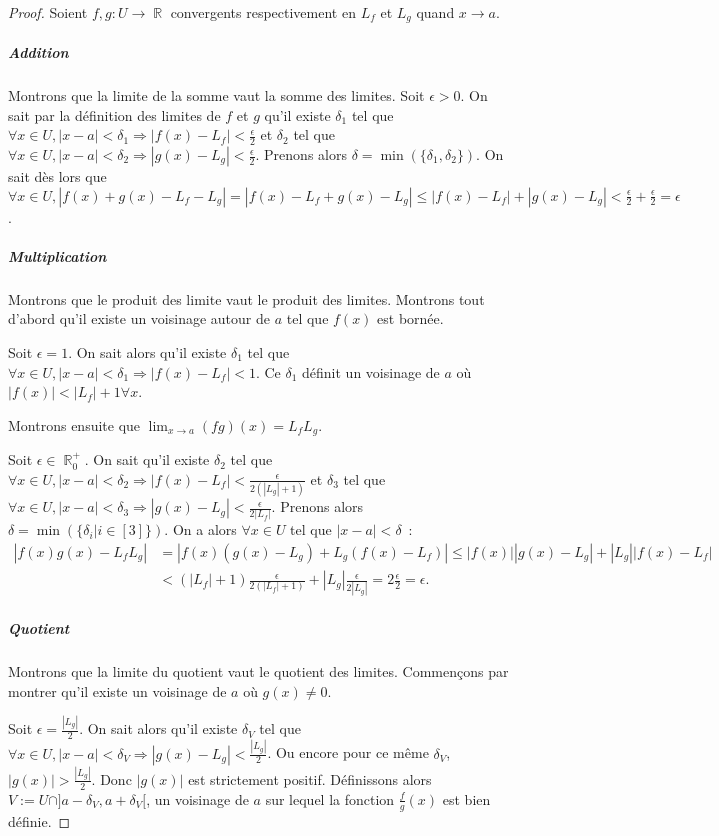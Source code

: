 \documentclass{article}
\DeclareMathOperator{\R}{\mathbb R}
\theoremstyle{definition}
\theoremstyle{remark}
\begin{document}
			\begin{proof} Soient $f, g : U \to \R$ convergents respectivement en $L_f$ et $L_g$ quand $x \to a$.

			\subparagraph{Addition} Montrons que la limite de la somme vaut la somme des limites.
			Soit $\epsilon > 0$. On sait par la définition des limites de $f$ et $g$ qu'il existe $\delta_1$ tel que $\forall x \in U, |x-a| < \delta_1
			\Rightarrow |f(x) - L_f| < \frac \epsilon2$
			et $\delta_2$ tel que $\forall x \in U, |x-a| < \delta_2 \Rightarrow |g(x)-L_g| < \frac \epsilon2$. Prenons alors $\delta = \min(\{\delta_1, \delta_2\})$.
			On sait dès lors que $\forall x \in U, |f(x) + g(x) - L_f - L_g| = |f(x)-L_f + g(x)-L_g| \leq |f(x)-L_f| + |g(x)-L_g| < \frac \epsilon2 + \frac \epsilon2 =
			\epsilon$.

			\subparagraph{Multiplication} Montrons que le produit des limite vaut le produit des limites. Montrons tout d'abord qu'il existe un voisinage autour de $a$
			tel que $f(x)$ est bornée.

			Soit $\epsilon = 1$. On sait alors qu'il existe $\delta_1$ tel que $\forall x \in U, |x-a| < \delta_1 \Rightarrow |f(x) - L_f| < 1$. Ce $\delta_1$
			définit un voisinage de $a$ où $|f(x)| < |L_f| + 1 \forall x$.

			Montrons ensuite que $\lim_{x \to a}(fg)(x) = L_fL_g$.

			Soit $\epsilon \in \R_0^+$. On sait qu'il existe $\delta_2$ tel que $\forall x \in U, |x-a| < \delta_2 \Rightarrow |f(x)-L_f| < \frac {\epsilon}{2(|L_g|+1)}$
			et $\delta_3$ tel que $\forall x \in U, |x-a| < \delta_3 \Rightarrow |g(x)-L_g| < \frac {\epsilon}{2|L_f|}$. Prenons alors
			$\delta = \min(\{\delta_i | i \in [3]\})$. On a alors $\forall x \in U$ tel que $|x-a| < \delta$~:
			\[\begin{aligned}
				|f(x)g(x) - L_fL_g| &= |f(x)(g(x) - L_g) + L_g(f(x) - L_f)| \leq |f(x)||g(x) - L_g| + |L_g||f(x) - L_f| \\
									&< (|L_f| + 1)\frac {\epsilon}{2(|L_f|+1)} + |L_g|\frac {\epsilon}{2|L_g|} = 2\frac {\epsilon}{2} = \epsilon.
			\end{aligned}\]

			\subparagraph{Quotient} Montrons que la limite du quotient vaut le quotient des limites. Commençons par montrer qu'il existe un voisinage de $a$ où
			$g(x) \neq 0$.

			Soit $\epsilon = \frac {|L_g|}2$. On sait alors qu'il existe $\delta_V$ tel que $\forall x \in U, |x-a| < \delta_V \Rightarrow |g(x)-L_g| < \frac {|L_g|}2$.
			Ou encore pour ce même $\delta_V$, $|g(x)| > \frac {|L_g|}2$. Donc $|g(x)|$ est strictement positif. Définissons alors $V := U \cap ]a-\delta_V, a+\delta_V[$,
			un voisinage de $a$ sur lequel la fonction $\frac fg(x)$ est bien définie.


\end{proof}
\end{document}

